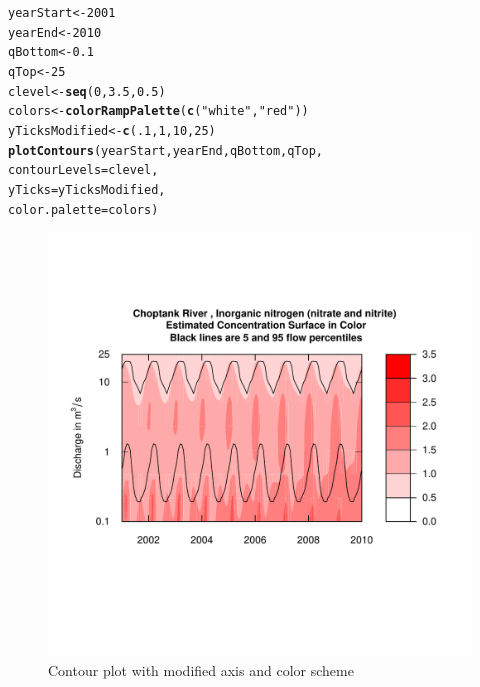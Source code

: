 \documentclass[a4paper,11pt]{article}\usepackage[]{graphicx}\usepackage[]{color}
\makeatletter
\newcommand{\hlnum}[1]{\textcolor[rgb]{0.686,0.059,0.569}{#1}}%
\newcommand{\hlstr}[1]{\textcolor[rgb]{0.192,0.494,0.8}{#1}}%
\newcommand{\hlstd}[1]{\textcolor[rgb]{0.345,0.345,0.345}{#1}}%
\newcommand{\hlkwb}[1]{\textcolor[rgb]{0.69,0.353,0.396}{#1}}%
\newcommand{\hlkwc}[1]{\textcolor[rgb]{0.333,0.667,0.333}{#1}}%
\newcommand{\hlkwd}[1]{\textcolor[rgb]{0.737,0.353,0.396}{\textbf{#1}}}%
\newenvironment{kframe}{%
 \def\at@end@of@kframe{}%
 \ifinner\ifhmode%
  \def\at@end@of@kframe{\end{minipage}}%
  \begin{minipage}{\columnwidth}%
 \fi\fi%
 \def\FrameCommand##1{\hskip\@totalleftmargin \hskip-\fboxsep
 \colorbox{shadecolor}{##1}\hskip-\fboxsep
     \hskip-\linewidth \hskip-\@totalleftmargin \hskip\columnwidth}%
 \MakeFramed {\advance\hsize-\width
   \@totalleftmargin\z@ \linewidth\hsize
   \@setminipage}}%
 {\par\unskip\endMakeFramed%
 \at@end@of@kframe}
\newenvironment{knitrout}{}{} %
\makeatother
\begin{document}
\begin{knitrout}
\color{fgcolor}\begin{kframe}
\begin{alltt}
\hlstd{yearStart} \hlkwb{<-} \hlnum{2001}
\hlstd{yearEnd} \hlkwb{<-} \hlnum{2010}
\hlstd{qBottom} \hlkwb{<-} \hlnum{0.1}
\hlstd{qTop}\hlkwb{<-} \hlnum{25}
\hlstd{clevel} \hlkwb{<-} \hlkwd{seq}\hlstd{(}\hlnum{0}\hlstd{,}\hlnum{3.5}\hlstd{,}\hlnum{0.5}\hlstd{)}
\hlstd{colors} \hlkwb{<-} \hlkwd{colorRampPalette}\hlstd{(}\hlkwd{c}\hlstd{(}\hlstr{"white"}\hlstd{,}\hlstr{"red"}\hlstd{))}
\hlstd{yTicksModified} \hlkwb{<-} \hlkwd{c}\hlstd{(}\hlnum{.1}\hlstd{,}\hlnum{1}\hlstd{,}\hlnum{10}\hlstd{,}\hlnum{25}\hlstd{)}
\hlkwd{plotContours}\hlstd{(yearStart,yearEnd,qBottom,qTop,}
             \hlkwc{contourLevels} \hlstd{= clevel,}
             \hlkwc{yTicks}\hlstd{=yTicksModified,}
             \hlkwc{color.palette}\hlstd{=colors)}
\end{alltt}
\end{kframe}\begin{figure}[]

\includegraphics[width=1\linewidth,height=1\linewidth]{figure/modifiedContour1} \caption[Contour plot with modified axis and color scheme]{Contour plot with modified axis and color scheme\label{fig:modifiedContour1}}
\end{figure}


\end{knitrout}
\end{document}
